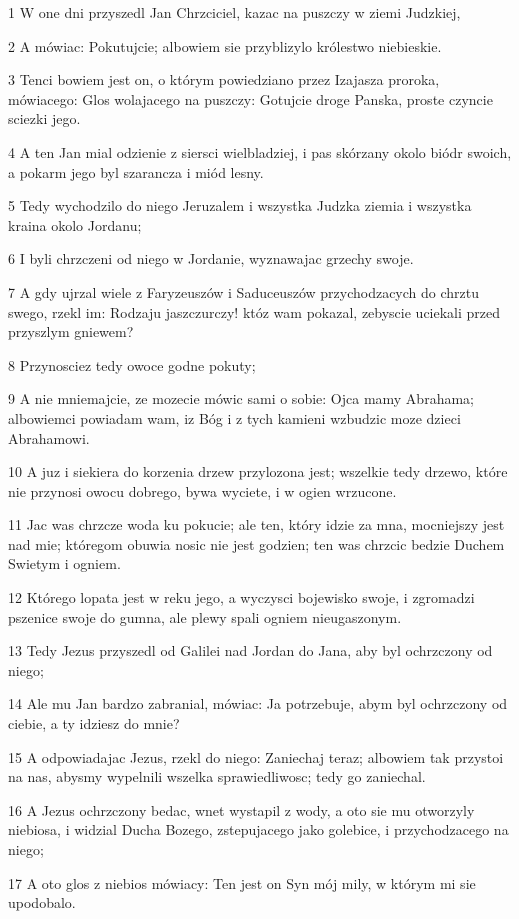 \par 1 W one dni przyszedl Jan Chrzciciel, kazac na puszczy w ziemi Judzkiej,
\par 2 A mówiac: Pokutujcie; albowiem sie przyblizylo królestwo niebieskie.
\par 3 Tenci bowiem jest on, o którym powiedziano przez Izajasza proroka, mówiacego: Glos wolajacego na puszczy: Gotujcie droge Panska, proste czyncie sciezki jego.
\par 4 A ten Jan mial odzienie z siersci wielbladziej, i pas skórzany okolo biódr swoich, a pokarm jego byl szarancza i miód lesny.
\par 5 Tedy wychodzilo do niego Jeruzalem i wszystka Judzka ziemia i wszystka kraina okolo Jordanu;
\par 6 I byli chrzczeni od niego w Jordanie, wyznawajac grzechy swoje.
\par 7 A gdy ujrzal wiele z Faryzeuszów i Saduceuszów przychodzacych do chrztu swego, rzekl im: Rodzaju jaszczurczy! któz wam pokazal, zebyscie uciekali przed przyszlym gniewem?
\par 8 Przynosciez tedy owoce godne pokuty;
\par 9 A nie mniemajcie, ze mozecie mówic sami o sobie: Ojca mamy Abrahama; albowiemci powiadam wam, iz Bóg i z tych kamieni wzbudzic moze dzieci Abrahamowi.
\par 10 A juz i siekiera do korzenia drzew przylozona jest; wszelkie tedy drzewo, które nie przynosi owocu dobrego, bywa wyciete, i w ogien wrzucone.
\par 11 Jac was chrzcze woda ku pokucie; ale ten, który idzie za mna, mocniejszy jest nad mie; któregom obuwia nosic nie jest godzien; ten was chrzcic bedzie Duchem Swietym i ogniem.
\par 12 Którego lopata jest w reku jego, a wyczysci bojewisko swoje, i zgromadzi pszenice swoje do gumna, ale plewy spali ogniem nieugaszonym.
\par 13 Tedy Jezus przyszedl od Galilei nad Jordan do Jana, aby byl ochrzczony od niego;
\par 14 Ale mu Jan bardzo zabranial, mówiac: Ja potrzebuje, abym byl ochrzczony od ciebie, a ty idziesz do mnie?
\par 15 A odpowiadajac Jezus, rzekl do niego: Zaniechaj teraz; albowiem tak przystoi na nas, abysmy wypelnili wszelka sprawiedliwosc; tedy go zaniechal.
\par 16 A Jezus ochrzczony bedac, wnet wystapil z wody, a oto sie mu otworzyly niebiosa, i widzial Ducha Bozego, zstepujacego jako golebice, i przychodzacego na niego;
\par 17 A oto glos z niebios mówiacy: Ten jest on Syn mój mily, w którym mi sie upodobalo.


